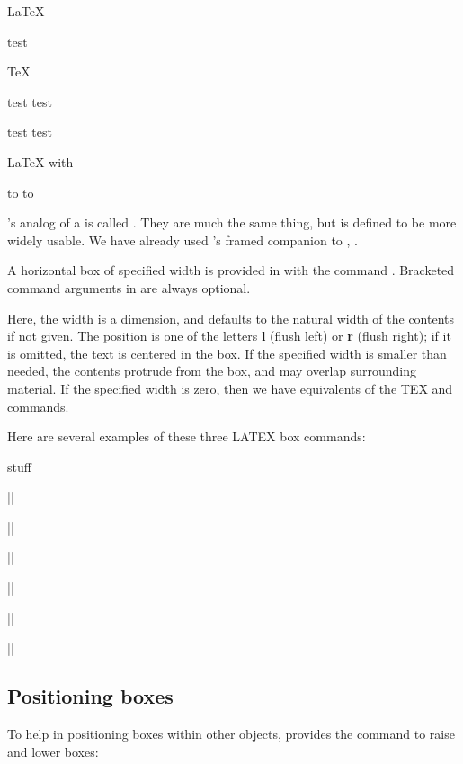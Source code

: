 {\begin{texexample}{}{}
\newbox\temp
\savebox{}
LaTeX

 \mbox{test}

TeX

\hbox{test} \hbox{test}

\indent\hbox{test} \hbox{test}

LaTeX with 

\makeatletter
\leavevmode\hbox to \wd{} \indent\hbox to \wd{}
\makeatother
\end{texexample}



\latex's analog of a is called . They are 
much the same thing, but  is defined to be more widely usable. We have already used \latex's framed companion to , .

A horizontal box of specified width is provided in \latex with the command
. Bracketed command arguments
in \latex are always optional. 

Here, the width is a \tex dimension,
and defaults to the natural width of the contents if not given. The position
is one of the letters \textbf{l} (flush left) or \textbf{r} (flush right); if it is omitted, the text
is centered in the box. If the specified width is smaller than needed, the
contents protrude from the box, and may overlap surrounding material. If
the specified width is zero, then we have equivalents of the TEX  and
 commands.


Here are several examples of these three LATEX box commands:

{\obeylines
\mbox{stuff}


||

||

||

||

||

||
}



\subsection{Positioning boxes}

To help in positioning boxes within other objects, \latex provides the command
 to raise and lower boxes:

}
